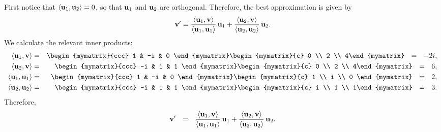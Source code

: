 \begin{solution}
  First notice that $\iprod{\vect{u}_1,\vect{u}_2}=0$, so that
  $\vect{u}_1$ and $\vect{u}_2$ are orthogonal. Therefore, the best
  approximation is given by
  \begin{equation*}
    \vect{v}' =
    \frac{\iprod{\vect{u}_1,\vect{v}}}{\iprod{\vect{u}_1,\vect{u}_1}}\,\vect{u}_1
    + \frac{\iprod{\vect{u}_2,\vect{v}}}{\iprod{\vect{u}_2,\vect{u}_2}}\,\vect{u}_2.
  \end{equation*}
  We calculate the relevant inner products:
  \begin{eqnarray*}
    \iprod{\vect{u}_1,\vect{v}}
    &=& \begin{mymatrix}{ccc} 1 & -i & 0 \end{mymatrix}
        \begin{mymatrix}{c} 0 \\ 2 \\ 4\end{mymatrix}
    ~~=~~ -2i,\\
    \iprod{\vect{u}_2,\vect{v}}
    &=& \begin{mymatrix}{ccc} -i & 1 & 1 \end{mymatrix}
        \begin{mymatrix}{c} 0 \\ 2 \\ 4\end{mymatrix}
    ~~=~~ 6,\\
    \iprod{\vect{u}_1,\vect{u}_1}
    &=& \begin{mymatrix}{ccc} 1 & -i & 0 \end{mymatrix}
        \begin{mymatrix}{c} 1 \\ i \\ 0 \end{mymatrix}
    ~~=~~ 2,\\
    \iprod{\vect{u}_2,\vect{u}_2}
    &=& \begin{mymatrix}{ccc} -i & 1 & 1 \end{mymatrix}
        \begin{mymatrix}{c} i \\ 1 \\ 1\end{mymatrix}
    ~~=~~ 3.
  \end{eqnarray*}    
  Therefore,
  \begin{equation*}
    \vect{v}'
    ~~=~~
    \frac{\iprod{\vect{u}_1,\vect{v}}}{\iprod{\vect{u}_1,\vect{u}_1}}\,\vect{u}_1
    + \frac{\iprod{\vect{u}_2,\vect{v}}}{\iprod{\vect{u}_2,\vect{u}_2}}\,\vect{u}_2.

\end{equation*}
\end{solution}
